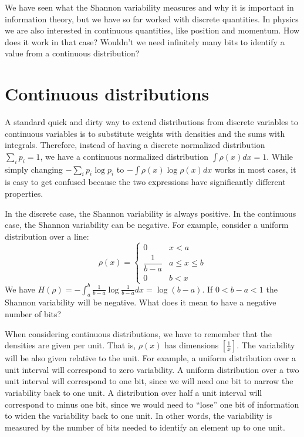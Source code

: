 \documentclass{article}
\begin{document}



We have seen what the Shannon variability measures and why it is important in information theory, but we have so far worked with discrete quantities. In physics we are also interested in continuous quantities, like position and momentum. How does it work in that case? Wouldn't we need infinitely many bits to identify a value from a continuous distribution?

\section{Continuous distributions}\label{sec_cont}

A standard quick and dirty way to extend distributions from discrete variables to continuous variables is to substitute weights with densities and the sums with integrals. Therefore, instead of having a discrete normalized distribution $\sum_i p_i = 1$, we have a continuous normalized distribution $\int \rho(x)dx=1$. While simply changing $- \sum_i p_i \log p_i$ to $- \int \rho(x) \log \rho(x) dx$ works in most cases, it is easy to get confused because the two expressions have significantly different properties.

In the discrete case, the Shannon variability is always positive. In the continuous case, the Shannon variability can be negative. For example, consider a uniform distribution over a line:
\begin{equation}
\rho(x)=
\begin{cases}
0 & x < a\\
\dfrac{1}{b-a} & a \leq x \leq b\\
0 & b < x
\end{cases}
\end{equation}
We have $H(\rho) = - \int_a^b \frac{1}{b-a} \log \frac{1}{b-a} dx = \log (b-a)$. If $0 < b-a < 1$ the Shannon variability will be negative. What does it mean to have a negative number of bits?

When considering continuous distributions, we have to remember that the densities are given per unit. That is, $\rho(x)$ has dimensions $[\frac{1}{x}]$. The variability will be also given relative to the unit. For example, a uniform distribution over a unit interval will correspond to zero variability. A uniform distribution over a two unit interval will correspond to one bit, since we will need one bit to narrow the variability back to one unit. A distribution over half a unit interval will correspond to minus one bit, since we would need to ``lose'' one bit of information to widen the variability back to one unit. In other words, the variability is measured by the number of bits needed to identify an element up to one unit.
\end{document}
